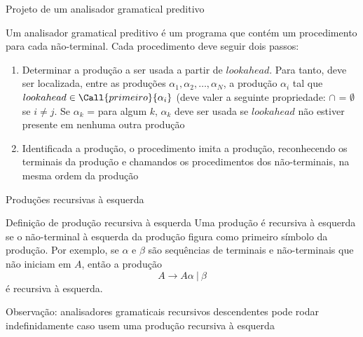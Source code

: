 \begin{frame}[fragile]{Projeto de um analisador gramatical preditivo}

    Um analisador gramatical preditivo é um programa que contém um procedimento para cada não-terminal. Cada procedimento deve seguir dois passos:
    \pause

    \begin{enumerate}
        \item Determinar a produção a ser usada a partir de $lookahead$. Para tanto, deve ser localizada, entre as produções $\alpha_1, \alpha_2, \ldots, \alpha_N$,
            a produção $\alpha_i$ tal que $lookahead \in \Call{primeiro}{\alpha_i}$ (deve valer a seguinte propriedade:  $\cap$
             = $\emptyset$ se $i\neq j$. Se $\alpha_k$ =  para algum $k$, $\alpha_k$ deve ser usada se $lookahead$ não estiver
            presente em nenhuma outra produção
        \pause

        \item Identificada a produção, o procedimento imita a produção, reconhecendo os terminais da produção e chamandos os procedimentos dos não-terminais, na
            mesma ordem da produção
    \end{enumerate}

\end{frame}

\begin{frame}[fragile]{Produções recursivas à esquerda}

    \begin{block}{Definição de produção recursiva à esquerda}
        Uma produção é recursiva à esquerda se o não-terminal à esquerda da produção figura como primeiro símbolo da produção. Por exemplo, se $\alpha$ e $\beta$
        são sequências de terminais e não-terminais que não iniciam em $A$, então a produção
        \[
            A \to A\alpha\ |\ \beta
        \]
        é recursiva à esquerda.
    \end{block}
    \pause

    \vspace{0.2in}
    Observação: analisadores gramaticais recursivos descendentes pode rodar indefinidamente caso usem uma produção recursiva à esquerda
\end{frame}

